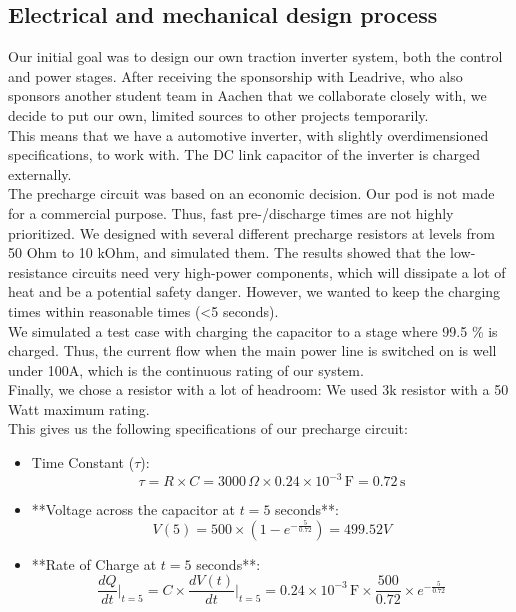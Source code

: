 \subsection{Electrical and mechanical design process}
Our initial goal was to design our own traction inverter system, both the control and power stages. After receiving the sponsorship with 
Leadrive, who also sponsors another student team
in Aachen that we collaborate closely with,
we decide to put our own, limited sources to other
projects temporarily. \\
This means that we have a automotive inverter,
with slightly overdimensioned specifications,
to work with. The DC link capacitor of the inverter is charged externally. \\
The precharge circuit was based on an economic decision. Our pod is not made for a commercial purpose. Thus, fast pre-/discharge times are not highly prioritized. We designed with several different precharge resistors at levels from 50 Ohm to 10 kOhm, and simulated them. The results showed that the low-resistance circuits need very high-power components, which will dissipate a lot of heat and be a potential safety danger. However, we wanted to keep the charging times within reasonable times (<5 seconds). \\
We simulated a test case with charging the capacitor to a stage where 99.5 \% is charged. Thus, the current flow when the main power line is switched on is well under 100A, which is the continuous rating of our system.
\\
Finally, we chose a resistor with a lot of headroom: We used 3k resistor with a 50 Watt maximum rating. \\
This gives us the following specifications of our precharge circuit:
\begin{itemize}
\item Time Constant (\( \tau \)):
\[ \tau = R \times C = 3000 \, \Omega \times 0.24 \times 10^{-3} \, \text{F} = 0.72 \, \text{s} \]

\item **Voltage across the capacitor at \( t = 5 \) seconds**:
\[ V(5) = 500 \times \left(1 - e^{-\frac{5}{0.72}}\right) = 499.52V \]

\item **Rate of Charge at \( t = 5 \) seconds**:
\[ \frac{dQ}{dt} \Bigg|_{t=5} = C \times \frac{dV(t)}{dt} \Bigg|_{t=5} = 0.24 \times 10^{-3} \, \text{F} \times \frac{500}{0.72} \times e^{-\frac{5}{0.72}} \]
\end{itemize}

